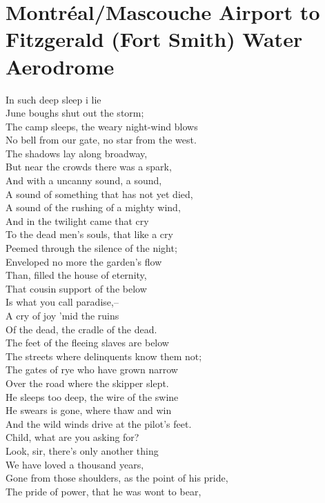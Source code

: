 \documentclass[smalldemyvopaper,11pt,twoside,onecolumn,openright,extrafontsizes]{memoir}
\begin{document}
\chapter{Montréal/Mascouche Airport to Fitzgerald (Fort Smith) Water Aerodrome}
In such deep sleep i lie
\\June boughs shut out the storm;
\\The camp sleeps, the weary night-wind blows
\\No bell from our gate, no star from the west.
\\The shadows lay along broadway,
\\But near the crowds there was a spark,
\\And with a uncanny sound, a sound,
\\A sound of something that has not yet died,
\\A sound of the rushing of a mighty wind,
\\And in the twilight came that cry
\\To the dead men's souls, that like a cry
\\Peemed through the silence of the night;
\\Enveloped no more the garden's flow
\\Than, filled the house of eternity,
\\That cousin support of the below
\\Is what you call paradise,--
\\A cry of joy 'mid the ruins
\\Of the dead, the cradle of the dead.
\\The feet of the fleeing slaves are below
\\The streets where delinquents know them not;
\\The gates of rye who have grown narrow
\\Over the road where the skipper slept.
\\He sleeps too deep, the wire of the swine
\\He swears is gone, where thaw and win
\\And the wild winds drive at the pilot's feet.
\\Child, what are you asking for?
\\Look, sir, there's only another thing
\\We have loved a thousand years,
\\Gone from those shoulders, as the point of his pride,
\\The pride of power, that he was wont to bear,
\end{document}
